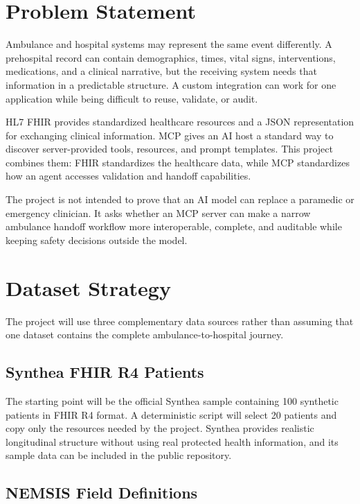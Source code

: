 \documentclass[10pt]{article}
\begin{document}
\section{Problem Statement}

Ambulance and hospital systems may represent the same event differently. A prehospital record can contain demographics, times, vital signs, interventions, medications, and a clinical narrative, but the receiving system needs that information in a predictable structure. A custom integration can work for one application while being difficult to reuse, validate, or audit.

HL7 FHIR provides standardized healthcare resources and a JSON representation for exchanging clinical information. MCP gives an AI host a standard way to discover server-provided tools, resources, and prompt templates. This project combines them: FHIR standardizes the healthcare data, while MCP standardizes how an agent accesses validation and handoff capabilities.

The project is not intended to prove that an AI model can replace a paramedic or emergency clinician. It asks whether an MCP server can make a narrow ambulance handoff workflow more interoperable, complete, and auditable while keeping safety decisions outside the model.

\section{Dataset Strategy}

The project will use three complementary data sources rather than assuming that one dataset contains the complete ambulance-to-hospital journey.

\subsection{Synthea FHIR R4 Patients}

The starting point will be the official Synthea sample containing 100 synthetic patients in FHIR R4 format. A deterministic script will select 20 patients and copy only the resources needed by the project. Synthea provides realistic longitudinal structure without using real protected health information, and its sample data can be included in the public repository.

\subsection{NEMSIS Field Definitions}
\end{document}
